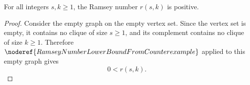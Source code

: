 \begin{helper}
For all integers \(s,k\ge1\), the Ramsey number \(r(s,k)\) is positive.
\end{helper}
\begin{proof}
Consider the empty graph on the empty vertex set.  Since the vertex set is
empty, it contains no clique of size \(s\ge1\), and its complement contains
no clique of size \(k\ge1\).  Therefore
\(\noderef{RamseyNumberLowerBoundFromCounterexample}\) applied to this empty
graph gives
\[
  0<r(s,k).
\]
\end{proof}

